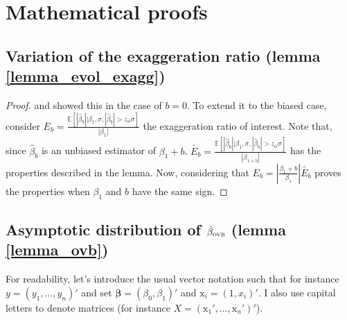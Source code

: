 \documentclass[usletter, 12pt]{article}
\begin{document}


		
	
\newpage
	



\newpage

\appendix

	\section{Mathematical proofs}\label{maths_proofs}
	

		\subsection{Variation of the exaggeration ratio (lemma \ref{lemma_evol_exagg})}
			
			\begin{proof}
				\cite{lu_note_2019} and \cite{zwet_significance_2021} showed this in the case of $b = 0$. 
				To extend it to the biased case, consider 
				$E_{b} = \frac{\mathbb{E}\left[ |\hat{\beta}_{b}| \big| \beta_{1}, \sigma, |\hat{\beta}_{b}| > z_{\alpha} \sigma \right]}{|\beta_{1}|}$ the exaggeration ratio of interest. 
				Note that, since $\hat{\beta}_{b}$ is an unbiased estimator of $\beta_{1} + b$, $\tilde{E_{b}} = \frac{\mathbb{E}\left[ |\hat{\beta}_{b}| \big| \beta_{1}, \sigma, |\hat{\beta}_{b}| > z_{\alpha} \sigma \right]}{|\beta_{1 + b}|}$ has the properties described in the lemma. 
				Now, considering that $E_{b} = \left| \frac{\beta_{1} + b}{\beta_{1}} \right| \tilde{E_{b}}$ proves the properties when $\beta_{1}$ and $b$ have the same sign.
			\end{proof}
	

\subsection{Asymptotic distribution of $\hat{\beta}_{\textsc{ovb}}$ (lemma \ref{lemma_ovb})}
			
			For readability, let's introduce the usual vector notation such that for instance $y = (y_1, ..., y_n)'$ and set $\bm{\beta} = (\beta_0, \beta_1)'$ and $\text{x}_i = (1, x_i)'$. I also use capital letters to denote matrices (for instance $X = (\text{x}_{1}', ..., \text{x}_{n}')'$).\\
			
\end{document}
